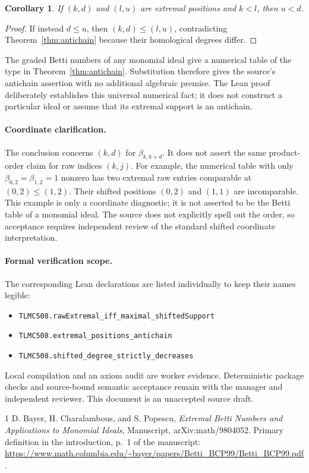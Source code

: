 \documentclass[11pt]{article}
\newtheorem{corollary}[theorem]{Corollary}
\begin{document}
\begin{corollary}\label{cor:decrease}
If $(k,d)$ and $(l,u)$ are extremal positions and $k<l$, then $u<d$.
\end{corollary}
\begin{proof}
If instead $d\le u$, then $(k,d)\le(l,u)$, contradicting
Theorem~\ref{thm:antichain} because their homological degrees differ.
\end{proof}

The graded Betti numbers of any monomial ideal give a numerical table
of the type in Theorem~\ref{thm:antichain}. Substitution therefore gives
the source's antichain assertion with no additional algebraic premise.
The Lean proof deliberately establishes this universal numerical fact;
it does not construct a particular ideal or assume that its extremal
support is an antichain.

\paragraph{Coordinate clarification.}
The conclusion concerns $(k,d)$ for $\beta_{k,k+d}$. It does not assert
the same product-order claim for raw indices $(k,j)$. For example, the
numerical table with only $\beta_{0,2}=\beta_{1,2}=1$ nonzero has two
extremal raw entries comparable at $(0,2)\le(1,2)$. Their shifted
positions $(0,2)$ and $(1,1)$ are incomparable. This example is only
a coordinate diagnostic; it is not asserted to be the Betti table of
a monomial ideal. The source does not explicitly spell out the order,
so acceptance requires independent review of the standard shifted
coordinate interpretation.

\paragraph{Formal verification scope.}
The corresponding Lean declarations are listed individually to keep their
names legible:
\begin{itemize}
\item \texttt{TLMC508.rawExtremal\_iff\_maximal\_shiftedSupport}
\item \texttt{TLMC508.extremal\_positions\_antichain}
\item \texttt{TLMC508.shifted\_degree\_strictly\_decreases}
\end{itemize}
Local compilation and an axiom audit are worker evidence. Deterministic
package checks and source-bound semantic acceptance remain with the manager
and independent reviewer. This document is an unaccepted source draft.

\begin{thebibliography}{1}
D. Bayer, H. Charalambous, and S. Popescu,
\emph{Extremal Betti Numbers and Applications to Monomial Ideals},
Manuscript, arXiv:math/9804052.
Primary definition in the introduction, p.~1 of the manuscript:
\url{https://www.math.columbia.edu/~bayer/papers/Betti_BCP99/Betti_BCP99.pdf}.
\end{thebibliography}
\end{document}
